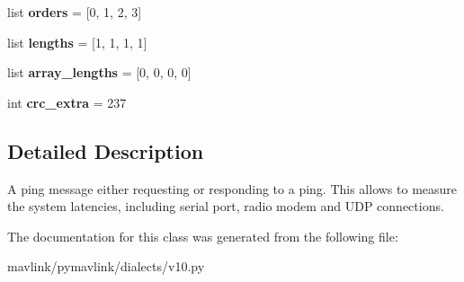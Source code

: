 \begin{DoxyCompactItemize}
\item 
\mbox{\label{classpymavlink_1_1dialects_1_1v10_1_1MAVLink__ping__message_ad718595d7f00eaf1deebbd114aafda8b}} 
list {\bfseries orders} = \mbox{[}0, 1, 2, 3\mbox{]}
\item 
\mbox{\label{classpymavlink_1_1dialects_1_1v10_1_1MAVLink__ping__message_a35a9bfcf4053e30db198f616f5562971}} 
list {\bfseries lengths} = \mbox{[}1, 1, 1, 1\mbox{]}
\item 
\mbox{\label{classpymavlink_1_1dialects_1_1v10_1_1MAVLink__ping__message_ab2bbce5ed0c7f52dba0bee4f929f776e}} 
list {\bfseries array\+\_\+lengths} = \mbox{[}0, 0, 0, 0\mbox{]}
\item 
\mbox{\label{classpymavlink_1_1dialects_1_1v10_1_1MAVLink__ping__message_abcf8a72ff71849e0e740b7869a782262}} 
int {\bfseries crc\+\_\+extra} = 237
\end{DoxyCompactItemize}


\subsection{Detailed Description}
\begin{DoxyVerb}A ping message either requesting or responding to a ping. This
allows to measure the system latencies, including serial port,
radio modem and UDP connections.
\end{DoxyVerb}
 

The documentation for this class was generated from the following file\+:\begin{DoxyCompactItemize}
\item 
mavlink/pymavlink/dialects/v10.\+py\end{DoxyCompactItemize}
